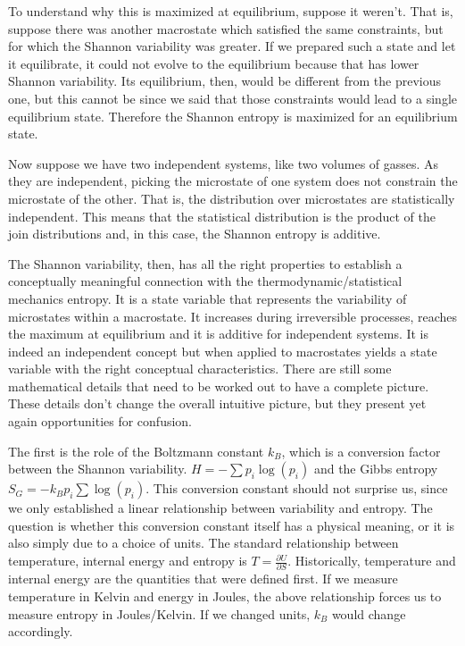 \documentclass{article}
\begin{document}
To understand why this is maximized at equilibrium, suppose it weren't. That is, suppose there was another macrostate which satisfied the same constraints, but for which the Shannon variability was greater. If we prepared such a state and let it equilibrate, it could not evolve to the equilibrium because that has lower Shannon variability. Its equilibrium, then, would be different from the previous one, but this cannot be since we said that those constraints would lead to a single equilibrium state. Therefore the Shannon entropy is maximized for an equilibrium state.

Now suppose we have two independent systems, like two volumes of gasses. As they are independent, picking the microstate of one system does not constrain the microstate of the other. That is, the distribution over microstates are statistically independent. This means that the statistical distribution is the product of the join distributions and, in this case, the Shannon entropy is additive.

The Shannon variability, then, has all the right properties to establish a conceptually meaningful connection with the thermodynamic/statistical mechanics entropy. It is a state variable that represents the variability of microstates within a macrostate. It increases during irreversible processes, reaches the maximum at equilibrium and it is additive for independent systems. It is indeed an independent concept but when applied to macrostates yields a state variable with the right conceptual characteristics. There are still some mathematical details that need to be worked out to have a complete picture. These details don't change the overall intuitive picture, but they present yet again opportunities for confusion.

The first is the role of the Boltzmann constant $k_B$, which is a conversion factor between the Shannon variability. $H = - \sum p_i \log(p_i)$ and the Gibbs entropy $S_G = - k_B p_i \sum \log(p_i)$. This conversion constant should not surprise us, since we only established a linear relationship between variability and entropy. The question is whether this conversion constant itself has a physical meaning, or it is also simply due to a choice of units. The standard relationship between temperature, internal energy and entropy is $T = \frac{\partial U}{\partial S}$. Historically, temperature and internal energy are the quantities that were defined first. If we measure temperature in Kelvin and energy in Joules, the above relationship forces us to measure entropy in Joules/Kelvin. If we changed units, $k_B$ would change accordingly.
\end{document}
